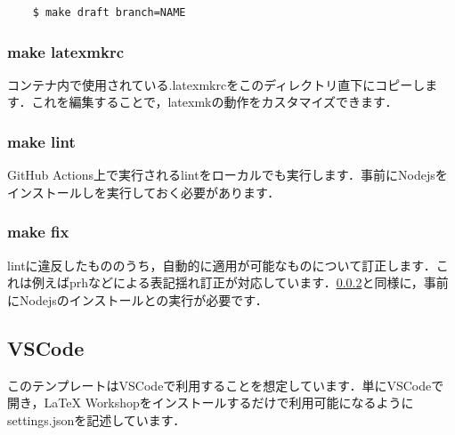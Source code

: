 \documentclass[main]{subfiles}
\begin{document}
\begin{lstlisting}
    $ make draft branch=NAME
\end{lstlisting}

\subsubsection{make latexmkrc}
\label{sec:mklatexmkrc}

コンテナ内で使用されている.latexmkrcをこのディレクトリ直下にコピーします．これを編集することで，latexmkの動作をカスタマイズできます．

\subsubsection{make lint}
\label{sec:mklint}

GitHub Actions上で実行されるlintをローカルでも実行します．事前にNodejsをインストールしを実行しておく必要があります．

\subsubsection{make fix}
\label{sec:mkfix}

lintに違反したもののうち，自動的に適用が可能なものについて訂正します．これは例えばprhなどによる表記揺れ訂正が対応しています．\ref{sec:mklint}と同様に，事前にNodejsのインストールとの実行が必要です．

\subsection{VSCode}

このテンプレートはVSCodeで利用することを想定しています．単にVSCodeで開き，LaTeX Workshopをインストールするだけで利用可能になるようにsettings.jsonを記述しています．
\end{document}
